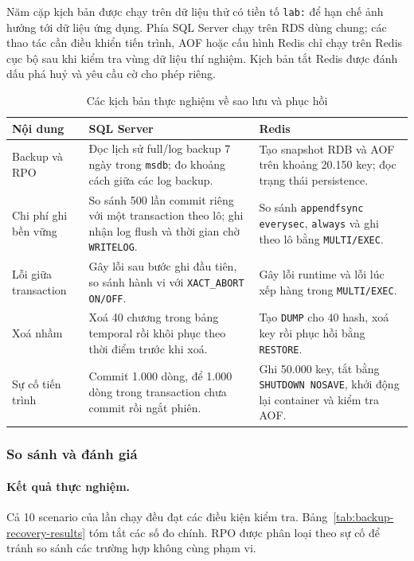 Năm cặp kịch bản được chạy trên dữ liệu thử có tiền tố \texttt{lab:} để hạn chế ảnh hưởng tới dữ liệu ứng dụng. Phía SQL Server chạy trên RDS dùng chung; các thao tác cần điều khiển tiến trình, AOF hoặc cấu hình Redis chỉ chạy trên Redis cục bộ sau khi kiểm tra vùng dữ liệu thí nghiệm. Kịch bản tắt Redis được đánh dấu phá huỷ và yêu cầu cờ cho phép riêng.

\begin{table}[H]
\centering
\small
\begin{tabularx}{\textwidth}{|p{}|X|X|}
\hline
\textbf{Nội dung} & \textbf{SQL Server} & \textbf{Redis} \\ \hline
Backup và RPO & Đọc lịch sử full/log backup 7 ngày trong \texttt{msdb}; đo khoảng cách giữa các log backup. & Tạo snapshot RDB và AOF trên khoảng 20.150 key; đọc trạng thái persistence. \\ \hline
Chi phí ghi bền vững & So sánh 500 lần commit riêng với một transaction theo lô; ghi nhận log flush và thời gian chờ \texttt{WRITELOG}. & So sánh \texttt{appendfsync everysec}, \texttt{always} và ghi theo lô bằng \texttt{MULTI/EXEC}. \\ \hline
Lỗi giữa transaction & Gây lỗi sau bước ghi đầu tiên, so sánh hành vi với \texttt{XACT\_ABORT ON/OFF}. & Gây lỗi runtime và lỗi lúc xếp hàng trong \texttt{MULTI/EXEC}. \\ \hline
Xoá nhầm & Xoá 40 chương trong bảng temporal rồi khôi phục theo thời điểm trước khi xoá. & Tạo \texttt{DUMP} cho 40 hash, xoá key rồi phục hồi bằng \texttt{RESTORE}. \\ \hline
Sự cố tiến trình & Commit 1.000 dòng, để 1.000 dòng trong transaction chưa commit rồi ngắt phiên. & Ghi 50.000 key, tắt bằng \texttt{SHUTDOWN NOSAVE}, khởi động lại container và kiểm tra AOF. \\ \hline
\end{tabularx}
\caption{Các kịch bản thực nghiệm về sao lưu và phục hồi}
\label{tab:backup-recovery-scenarios}
\end{table}

\subsubsection{So sánh và đánh giá}

\paragraph{Kết quả thực nghiệm.} Cả 10 scenario của lần chạy đều đạt các điều kiện kiểm tra. Bảng~\ref{tab:backup-recovery-results} tóm tắt các số đo chính. RPO được phân loại theo sự cố để tránh so sánh các trường hợp không cùng phạm vi.

